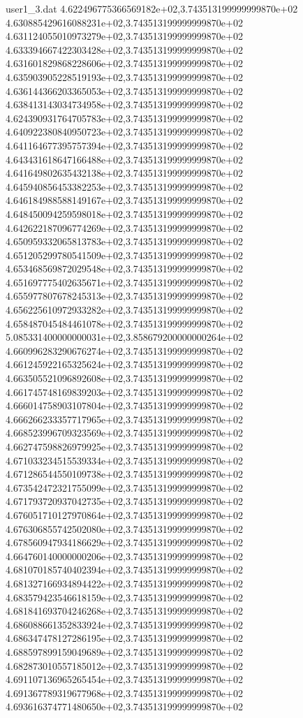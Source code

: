 \begin{filecontents}{user1_3.dat}
4.622496775366569182e+02,3.743513199999999870e+02
4.630885429616088231e+02,3.743513199999999870e+02
4.631124055010973279e+02,3.743513199999999870e+02
4.633394667422303428e+02,3.743513199999999870e+02
4.631601829868228606e+02,3.743513199999999870e+02
4.635903905228519193e+02,3.743513199999999870e+02
4.636144366203365053e+02,3.743513199999999870e+02
4.638413143034734958e+02,3.743513199999999870e+02
4.624390931764705783e+02,3.743513199999999870e+02
4.640922380840950723e+02,3.743513199999999870e+02
4.641164677395757394e+02,3.743513199999999870e+02
4.643431618647166488e+02,3.743513199999999870e+02
4.641649802635432138e+02,3.743513199999999870e+02
4.645940856453382253e+02,3.743513199999999870e+02
4.646184988588149167e+02,3.743513199999999870e+02
4.648450094259598018e+02,3.743513199999999870e+02
4.642622187096774269e+02,3.743513199999999870e+02
4.650959332065813783e+02,3.743513199999999870e+02
4.651205299780541509e+02,3.743513199999999870e+02
4.653468569872029548e+02,3.743513199999999870e+02
4.651697775402635671e+02,3.743513199999999870e+02
4.655977807678245313e+02,3.743513199999999870e+02
4.656225610972933282e+02,3.743513199999999870e+02
4.658487045484461078e+02,3.743513199999999870e+02
5.085331400000000031e+02,3.858679200000000264e+02
4.660996283290676274e+02,3.743513199999999870e+02
4.661245922165325624e+02,3.743513199999999870e+02
4.663505521096892608e+02,3.743513199999999870e+02
4.661745748169839203e+02,3.743513199999999870e+02
4.666014758903107804e+02,3.743513199999999870e+02
4.666266233357717965e+02,3.743513199999999870e+02
4.668523996709323569e+02,3.743513199999999870e+02
4.662747598826979925e+02,3.743513199999999870e+02
4.671033234515539334e+02,3.743513199999999870e+02
4.671286544550109738e+02,3.743513199999999870e+02
4.673542472321755099e+02,3.743513199999999870e+02
4.671793720937042735e+02,3.743513199999999870e+02
4.676051710127970864e+02,3.743513199999999870e+02
4.676306855742502080e+02,3.743513199999999870e+02
4.678560947934186629e+02,3.743513199999999870e+02
4.664760140000000206e+02,3.743513199999999870e+02
4.681070185740402394e+02,3.743513199999999870e+02
4.681327166934894422e+02,3.743513199999999870e+02
4.683579423546618159e+02,3.743513199999999870e+02
4.681841693704246268e+02,3.743513199999999870e+02
4.686088661352833924e+02,3.743513199999999870e+02
4.686347478127286195e+02,3.743513199999999870e+02
4.688597899159049689e+02,3.743513199999999870e+02
4.682873010557185012e+02,3.743513199999999870e+02
4.691107136965265454e+02,3.743513199999999870e+02
4.691367789319677968e+02,3.743513199999999870e+02
4.693616374771480650e+02,3.743513199999999870e+02

\end{filecontents}
